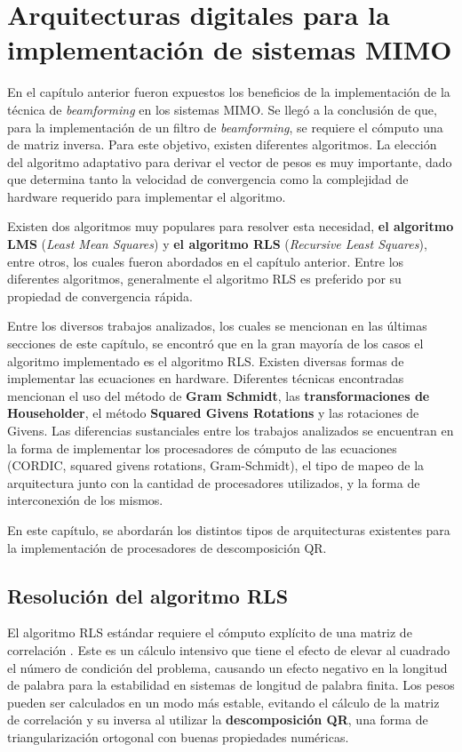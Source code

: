 \chapter{Arquitecturas digitales para la implementación de sistemas MIMO}

En el capítulo anterior fueron expuestos los beneficios de la implementación de la técnica de \textit{beamforming} en los sistemas MIMO. Se llegó a la conclusión de que, para la implementación de un filtro de \textit{beamforming}, se requiere el cómputo una de matriz inversa. Para este objetivo, existen diferentes algoritmos. La elección del algoritmo adaptativo para derivar el vector de pesos es muy importante, dado que determina tanto la velocidad de convergencia como la complejidad de hardware requerido para implementar el algoritmo.

Existen dos algoritmos muy populares para resolver esta necesidad, \textbf{el algoritmo LMS} (\textit{Least Mean Squares}) y \textbf{el algoritmo RLS} (\textit{Recursive Least Squares}), entre otros, los cuales fueron abordados en el capítulo anterior. Entre los diferentes algoritmos, generalmente el algoritmo RLS es preferido por su propiedad de convergencia rápida.

Entre los diversos trabajos analizados, los cuales se mencionan en las últimas secciones de este capítulo, se encontró que en la gran mayoría de los casos el algoritmo implementado es el algoritmo RLS. Existen diversas formas de implementar las ecuaciones en hardware. Diferentes técnicas encontradas mencionan el uso del método de \textbf{Gram Schmidt}, las \textbf{transformaciones de Householder}, el método \textbf{Squared Givens Rotations} y las rotaciones de Givens. Las diferencias sustanciales entre los trabajos analizados se encuentran en la forma de implementar los procesadores de cómputo de las ecuaciones (CORDIC, squared givens rotations, Gram-Schmidt), el tipo de mapeo de la arquitectura junto con la cantidad de procesadores utilizados, y la forma de interconexión de los mismos.

En este capítulo, se abordarán los distintos tipos de arquitecturas existentes para la implementación de procesadores de descomposición QR.

\section{Resolución del algoritmo RLS}

El algoritmo RLS estándar requiere el cómputo explícito de una matriz de correlación \cite{Woods}. Este es un cálculo intensivo que tiene el efecto de elevar al cuadrado el número de condición del problema, causando un efecto negativo en la longitud de palabra para la estabilidad en sistemas de longitud de palabra finita. Los pesos pueden ser calculados en un modo más estable, evitando el cálculo de la matriz de correlación y su inversa al utilizar la \textbf{descomposición QR}, una forma de triangularización ortogonal con buenas propiedades numéricas.

